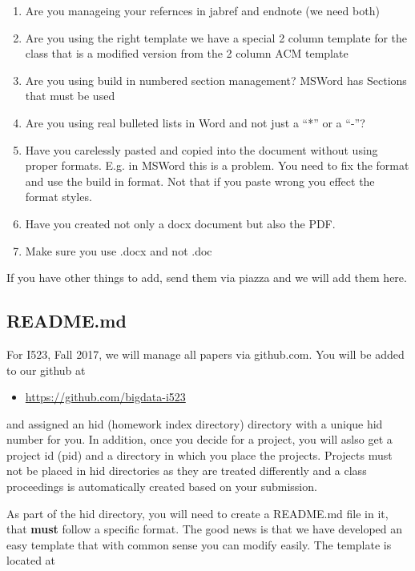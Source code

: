 \begin{enumerate}

\item
  Are you manageing your refernces in jabref and endnote (we need both)
\item
  Are you using the right template we have a special 2 column template
  for the class that is a modified version from the 2 column ACM
  template
\item
  Are you using build in numbered section management? MSWord has
  Sections that must be used
\item
  Are you using real bulleted lists in Word and not just a ``*'' or a
  ``-''?
\item
  Have you carelessly pasted and copied into the document without using
  proper formats. E.g. in MSWord this is a problem. You need to fix the
  format and use the build in format. Not that if you paste wrong you
  effect the format styles.
\item
  Have you created not only a docx document but also the PDF.
\item
  Make sure you use .docx and not .doc
\end{enumerate}

If you have other things to add, send them via piazza and we will add
them here.

\subsection{README.md}\label{readme.md}

For I523, Fall 2017, we will manage all papers via github.com. You will
be added to our github at

\begin{itemize}

\item
  \url{https://github.com/bigdata-i523}
\end{itemize}

and assigned an hid (homework index directory) directory with a unique
hid number for you. In addition, once you decide for a project, you will
aslso get a project id (pid) and a directory in which you place the
projects. Projects must not be placed in hid directories as they are
treated differently and a class proceedings is automatically created
based on your submission.

As part of the hid directory, you will need to create a README.md file
in it, that \textbf{must} follow a specific format. The good news is
that we have developed an easy template that with common sense you can
modify easily. The template is located at

